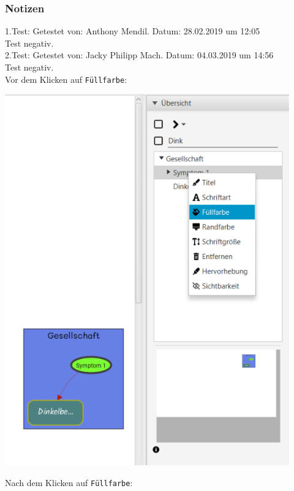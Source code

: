 \documentclass[enabledeprecatedfontcommands]{scrartcl}
\begin{document}
\subsubsection{Notizen}
1.Test: Getestet von: Anthony Mendil. Datum: 28.02.2019 um 12:05 \\
Test negativ.\\
2.Test: Getestet von: Jacky Philipp Mach. Datum: 04.03.2019 um 14:56 \\
Test negativ.\\
Vor dem Klicken auf \texttt{Füllfarbe}:
\begin{center}
\includegraphics[height=16cm]{farbeSymptomUebersichtVorher.PNG}
\end{center}
Nach dem Klicken auf \texttt{Füllfarbe}: 
\end{document}
